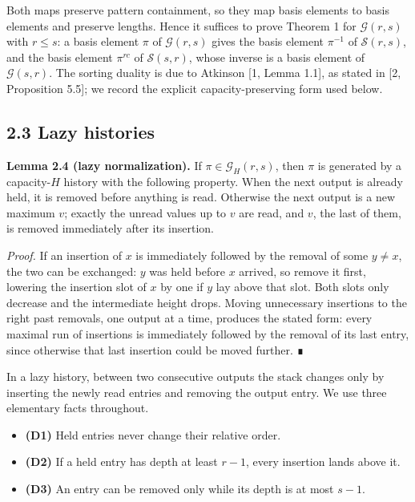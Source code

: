 \documentclass[11pt,letterpaper]{article}
\providecommand{\tightlist}{\setlength{\itemsep}{0pt}\setlength{\parskip}{0pt}}
\begin{document}
Both maps preserve pattern containment, so they map basis elements to
basis elements and preserve lengths. Hence it suffices to prove Theorem
1 for \(\mathcal G(r,s)\) with \(r\le s\): a basis element \(\pi\) of
\(\mathcal G(r,s)\) gives the basis element \(\pi^{-1}\) of
\(\mathcal S(r,s)\), and the basis element \(\pi^{rc}\) of
\(\mathcal S(s,r)\), whose inverse is a basis element of
\(\mathcal G(s,r)\). The sorting duality is due to Atkinson {[}1, Lemma
1.1{]}, as stated in {[}2, Proposition 5.5{]}; we record the explicit
capacity-preserving form used below.

\subsection{2.3 Lazy histories}\label{lazy-histories}

\textbf{Lemma 2.4 (lazy normalization).} If \(\pi\in\mathcal G_H(r,s)\),
then \(\pi\) is generated by a capacity-\(H\) history with the following
property. When the next output is already held, it is removed before
anything is read. Otherwise the next output is a new maximum \(v\);
exactly the unread values up to \(v\) are read, and \(v\), the last of
them, is removed immediately after its insertion.

\emph{Proof.} If an insertion of \(x\) is immediately followed by the
removal of some \(y\ne x\), the two can be exchanged: \(y\) was held
before \(x\) arrived, so remove it first, lowering the insertion slot of
\(x\) by one if \(y\) lay above that slot. Both slots only decrease and
the intermediate height drops. Moving unnecessary insertions to the
right past removals, one output at a time, produces the stated form:
every maximal run of insertions is immediately followed by the removal
of its last entry, since otherwise that last insertion could be moved
further. ∎

In a lazy history, between two consecutive outputs the stack changes
only by inserting the newly read entries and removing the output entry.
We use three elementary facts throughout.

\begin{itemize}
\tightlist
\item
  \textbf{(D1)} Held entries never change their relative order.
\item
  \textbf{(D2)} If a held entry has depth at least \(r-1\), every
  insertion lands above it.
\item
  \textbf{(D3)} An entry can be removed only while its depth is at most
  \(s-1\).
\end{itemize}
\end{document}
